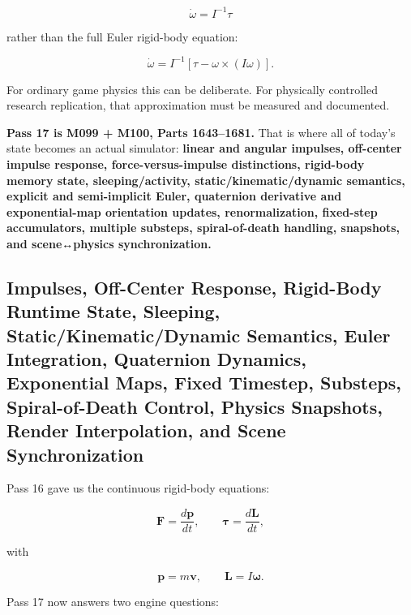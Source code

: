 \[
\dot\omega=I^{-1}\tau
\]

rather than the full Euler rigid-body equation:

\[
\boxed{
\dot\omega
=
I^{-1}
[
\tau-\omega\times(I\omega)
].
}
\]

For ordinary game physics this can be deliberate. For physically controlled research replication, that approximation must be measured and documented.

\textbf{Pass 17 is M099 + M100, Parts 1643--1681.} That is where all of today's state becomes an actual simulator: \textbf{linear and angular impulses, off-center impulse response, force-versus-impulse distinctions, rigid-body memory state, sleeping/activity, static/kinematic/dynamic semantics, explicit and semi-implicit Euler, quaternion derivative and exponential-map orientation updates, renormalization, fixed-step accumulators, multiple substeps, spiral-of-death handling, snapshots, and scene↔physics synchronization.}

\subsection{Impulses, Off-Center Response, Rigid-Body Runtime State, Sleeping, Static/Kinematic/Dynamic Semantics, Euler Integration, Quaternion Dynamics, Exponential Maps, Fixed Timestep, Substeps, Spiral-of-Death Control, Physics Snapshots, Render Interpolation, and Scene Synchronization}\label{06-engine-ii-ch036-impulses-off-center-response-rigid-body-runtime-state-sleeping-statickinematicdynamic-semantics-euler-integration-quaternion-dynamics-exponential-maps-fixed-timestep-substeps-spiral-of-death-control-physics-snapshots-render-interpolation-and-scene-synchronization}

\hypertarget{06-engine-ii-ch036-impulses-off-center-response-rigid-body-runtime-state-sleeping-statickinematicdynamic-semantics-euler-integration-quaternion-dynamics-exponential-maps-fixed-timestep-substeps-spiral-of-death-control-physics-snapshots-render-interpolation-and-scene-synchronization}{}

Pass 16 gave us the continuous rigid-body equations:

\[
\mathbf F=\frac{d\mathbf p}{dt},
\qquad
\boldsymbol\tau=\frac{d\mathbf L}{dt},
\]

with

\[
\mathbf p=m\mathbf v,
\qquad
\mathbf L=I\boldsymbol\omega.
\]

Pass 17 now answers two engine questions:

